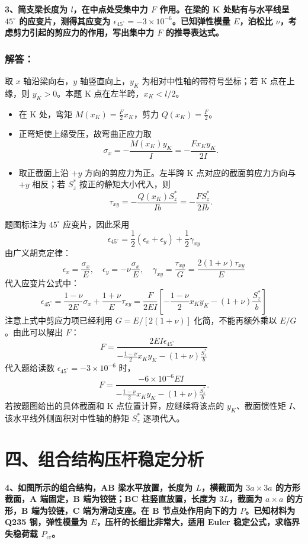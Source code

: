 \documentclass[11pt,a4paper]{ctexrep}
\begin{document}
{\textbf{3、简支梁长度为 $l$，在中点处受集中力 $F$ 作用。在梁的 K 处贴有与水平线呈 $45^\circ$ 的应变片，测得其应变为 $\epsilon_{45^\circ} = -3 \times 10^{-6}$。已知弹性模量 $E$，泊松比 $\nu$，考虑剪力引起的剪应力的作用，写出集中力 $F$ 的推导表达式。}

\subsubsection*{解答：}

取 $x$ 轴沿梁向右，$y$ 轴竖直向上，$y_K$ 为相对中性轴的带符号坐标；若 K 点在上缘，则 $y_K>0$。本题 K 点在左半跨，$x_K<l/2$。
\begin{itemize}
    \item 在 K 处，弯矩 $M(x_K) = \frac{F}{2} x_K$，剪力 $Q(x_K) = \frac{F}{2}$。
    \item 正弯矩使上缘受压，故弯曲正应力取
    \[
        \sigma_x = -\frac{M(x_K)y_K}{I}=-\frac{F x_K y_K}{2I}.
    \]
    \item 取正截面上沿 $+y$ 方向的剪应力为正。左半跨 K 点对应的截面剪应力方向与 $+y$ 相反；若 $S_z^*$ 按正的静矩大小代入，则
    \[
        \tau_{xy} = -\frac{Q(x_K) S_z^*}{Ib} = -\frac{F S_z^*}{2Ib}.
    \]
\end{itemize}
题图标注为 $45^\circ$ 应变片，因此采用
\[
    \epsilon_{45^\circ} = \frac{1}{2}(\epsilon_x + \epsilon_y) + \frac{1}{2}\gamma_{xy}
\]
由广义胡克定律：
\[
    \epsilon_x = \frac{\sigma_x}{E}, \quad \epsilon_y = -\nu \frac{\sigma_x}{E}, \quad \gamma_{xy} = \frac{\tau_{xy}}{G} = \frac{2(1+\nu)\tau_{xy}}{E}
\]
代入应变片公式中：
\[
    \epsilon_{45^\circ}
    = \frac{1-\nu}{2E}\sigma_x + \frac{1+\nu}{E}\tau_{xy}
    = \frac{F}{2EI} \left[ -\frac{1-\nu}{2} x_K y_K -(1+\nu)\frac{S_z^*}{b} \right]
\]
注意上式中剪应力项已经利用 $G=E/[2(1+\nu)]$ 化简，不能再额外乘以 $E/G$。由此可以解出 $F$：
\[
    F = \frac{2 E I \epsilon_{45^\circ}}{-\frac{1-\nu}{2} x_K y_K -(1+\nu)\frac{S_z^*}{b}}
\]
代入题给读数 $\epsilon_{45^\circ}=-3\times 10^{-6}$ 时，
\[
    F = \frac{-6\times 10^{-6} E I}{-\frac{1-\nu}{2} x_K y_K -(1+\nu)\frac{S_z^*}{b}}
    .
\]
若按题图给出的具体截面和 K 点位置计算，应继续将该点的 $y_K$、截面惯性矩 $I$、该水平线外侧面积对中性轴的静矩 $S_z^*$ 逐项代入。




\section*{四、组合结构压杆稳定分析}

\textbf{4、如图所示的组合结构，AB 梁水平放置，长度为 $L$，横截面为 $3a \times 3a$ 的方形截面，A 端固定，B 端为铰链；BC 柱竖直放置，长度为 $3L$，截面为 $a \times a$ 的方形，B 端为铰链，C 端为滑动支座。在 B 节点处作用向下的力 $P$。已知材料为 Q235 钢，弹性模量为 $E$，压杆的长细比非常大，适用 Euler 稳定公式，求临界失稳荷载 $P_{\text{cr}}$。}

}
\end{document}
